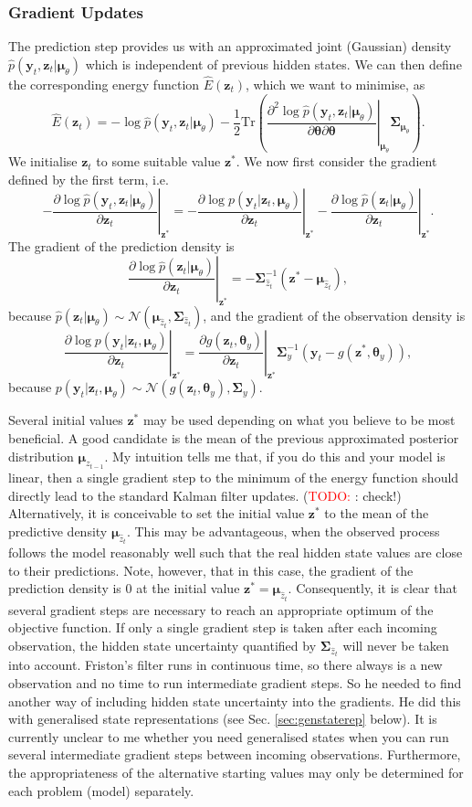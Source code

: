 \documentclass[a4paper,10pt]{article}
\newcommand{\todo}{\textcolor{red}{TODO: }}
\newcommand{\bs}[1]{\mathbf{#1}}					%
\newcommand{\bgs}[1]{\boldsymbol{#1}}				%
\newcommand{\pd}[2]{\frac{\partial #1}{\partial #2}} 	%
\newcommand{\ppd}[3]{\frac{\partial^2 #1}{\partial #2 \partial #3}} %
\newcommand{\eq}[1]{\begin{equation} #1 \end{equation}}%
\newcommand{\trace}[1]{\mathrm{Tr}\left(#1\right)}					%
\renewcommand{\ss}{z}         %
\newcommand{\so}{y}         %
\newcommand{\spm}{\mu}    %
\renewcommand{\sp}{\theta}    %
\newcommand{\ps}{\bs{\ss}}    %
\newcommand{\po}{\bs{\so}}    %
\newcommand{\ppm}{\bgs{\spm}}   %
\newcommand{\pp}{\bgs{\sp}} %
\newcommand{\N}{\mathcal{N}}			%
\newcommand{\Cov}{\bgs{\Sigma}}			%
\begin{document}
\subsubsection{Gradient Updates}
The prediction step provides us with an approximated joint (Gaussian) density $\hat{p}(\po_t,\ps_t|\ppm_\sp)$ which is independent of previous hidden states. We can then define the corresponding energy function $\hat{E}(\ps_t)$, which we want to minimise, as
\eq{
    \hat{E}(\ps_t) = - \log \hat{p}(\po_t,\ps_t|\ppm_\sp) - \frac{1}{2}\trace{\left.\ppd{\log \hat{p}(\po_t,\ps_t|\ppm_\sp)}{\pp}{\pp}\right|_{\ppm_\sp}\Cov_{\ppm_\sp}}.
}
We initialise $\ps_t$ to some suitable value $\ps^*$. We now first consider the gradient defined by the first term, i.e.
\eq{
    \left. -\pd{\log \hat{p}(\po_t,\ps_t|\ppm_\sp)}{\ps_t} \right|_{\ps^*} = \left. -\pd{\log p(\po_t|\ps_t,\ppm_\sp)}{\ps_t} \right|_{\ps^*} - \left. \pd{\log \hat{p}(\ps_t|\ppm_\sp)}{\ps_t} \right|_{\ps^*}.
}
The gradient of the prediction density is
\eq{
    \left. \pd{\log \hat{p}(\ps_t|\ppm_\sp)}{\ps_t} \right|_{\ps^*} = -\Cov_{\hat{\ss}_t}^{-1} (\ps^* - \ppm_{\hat{\ss}_t}),
}
because $\hat{p}(\ps_t|\ppm_\sp) \sim \N(\ppm_{\hat{\ss}_t}, \Cov_{\hat{\ss}_t})$, and the gradient of the observation density is
\eq{
    \left. \pd{\log p(\po_t|\ps_t,\ppm_\sp)}{\ps_t} \right|_{\ps^*} = \left. \pd{g(\ps_t, \pp_\so)}{\ps_t} \right|_{\ps^*}\Cov_\so^{-1}(\po_t - g(\ps^*, \pp_\so)),
}
because $p(\po_t|\ps_t,\ppm_\sp) \sim \N(g(\ps_t, \pp_\so), \Cov_\so)$.

Several initial values $\ps^*$ may be used depending on what you believe to be most beneficial. A good candidate is the mean of the previous approximated posterior distribution $\ppm_{\ss_{t-1}}$. My intuition tells me that, if you do this and your model is linear, then a single gradient step to the minimum of the energy function should directly lead to the standard Kalman filter updates. (\todo: check!) Alternatively, it is conceivable to set the initial value $\ps^*$ to the mean of the predictive density $\ppm_{\hat{\ss}_t}$. This may be advantageous, when the observed process follows the model reasonably well such that the real hidden state values are close to their predictions. Note, however, that in this case, the gradient of the prediction density is 0 at the initial value $\ps^* = \ppm_{\hat{\ss}_t}$. Consequently, it is clear that several gradient steps are necessary to reach an appropriate optimum of the objective function. If only a single gradient step is taken after each incoming observation, the hidden state uncertainty quantified by $\Cov_{\hat{\ss}_t}$ will never be taken into account. Friston's filter runs in continuous time, so there always is a new observation and no time to run intermediate gradient steps. So he needed to find another way of including hidden state uncertainty into the gradients. He did this with generalised state representations (see Sec. \ref{sec:genstaterep} below). It is currently unclear to me whether you need generalised states when you can run several intermediate gradient steps between incoming observations. Furthermore, the appropriateness of the alternative starting values may only be determined for each problem (model) separately.
\end{document}
